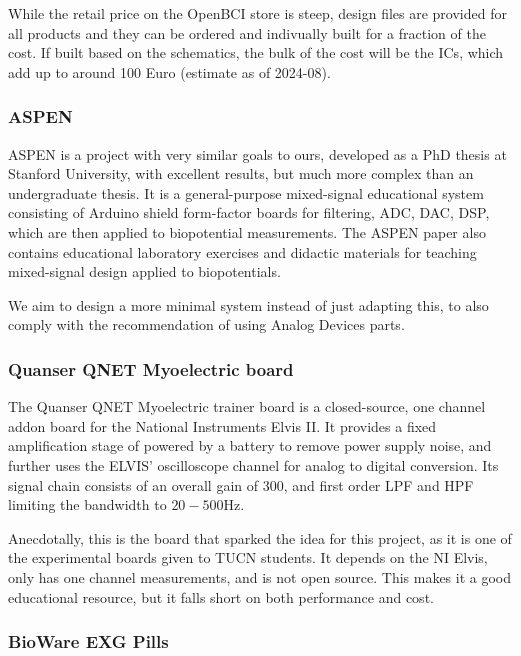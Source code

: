 \documentclass{thesis}
\newcommand{\Hz}{\unit{\hertz}}
\begin{document}
While the retail price on the OpenBCI store is steep, design files are provided for all products and they can be ordered and indivually built for a fraction of the cost. If built based on the schematics, the bulk of the cost will be the ICs, which add up to around 100 Euro (estimate as of 2024-08).

\subsubsection*{ASPEN}

ASPEN\cite{Esposito2018} is a project with very similar goals to ours, developed as a PhD thesis at Stanford University, with excellent results, but much more complex than an undergraduate thesis. It is a general-purpose mixed-signal educational system consisting of Arduino shield form-factor boards for filtering, ADC, DAC, DSP, which are then applied to biopotential measurements. The ASPEN paper also contains educational laboratory exercises and didactic materials for teaching mixed-signal design applied to biopotentials.

We aim to design a more minimal system instead of just adapting this, to also comply with the recommendation of using Analog Devices parts.

\subsubsection*{Quanser QNET Myoelectric board}

The Quanser QNET Myoelectric trainer board is a closed-source, one channel addon board for the National Instruments Elvis II. It provides a fixed amplification stage of  powered by a battery to remove power supply noise, and further uses the ELVIS' oscilloscope channel for analog to digital conversion. Its signal chain consists of an overall gain of $300$, and first order LPF and HPF limiting the bandwidth to $20-500\Hz$.

Anecdotally, this is the board that sparked the idea for this project, as it is one of the experimental boards given to TUCN students.  It depends on the NI Elvis, only has one channel measurements, and is not open source. This makes it a good educational resource, but it falls short on both performance and cost.

\subsubsection*{BioWare EXG Pills}
\end{document}
